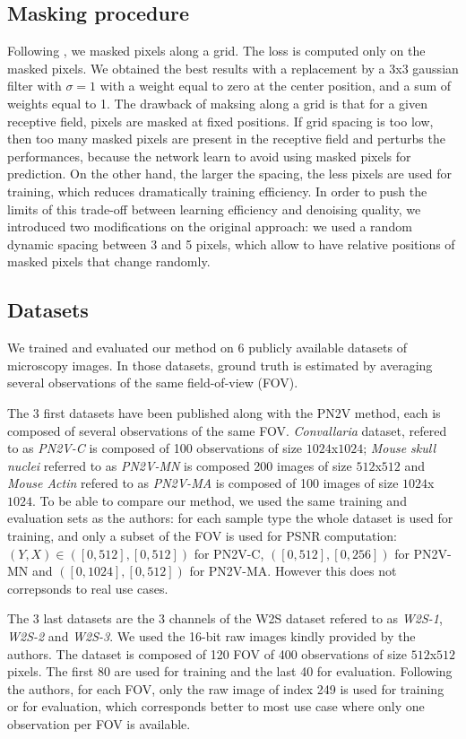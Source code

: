 \documentclass{article}
\begin{document}
\subsection{Masking procedure}
Following \cite{batson2019noise2self}, we masked pixels along a grid. The loss is computed only on the masked pixels.
We obtained the best results with a replacement by a 3x3 gaussian filter with $\sigma=1$ with a weight equal to zero at the center position, and a sum of weights equal to 1.
The drawback of maksing along a grid is that for a given receptive field, pixels are masked at fixed positions. If grid spacing is too low, then too many masked pixels are present in the receptive field and perturbs the performances, because the network learn to avoid using masked pixels for prediction. On the other hand, the larger the spacing, the less pixels are used for training, which reduces dramatically training efficiency.
In order to push the limits of this trade-off between learning efficiency and denoising quality, we introduced two modifications on the original approach: we used a random dynamic spacing between 3 and 5 pixels, which allow to have relative positions of masked pixels that change randomly.

\subsection{Datasets}
We trained and evaluated our method on 6 publicly available datasets of microscopy images. In those datasets, ground truth is estimated by averaging several observations of the same field-of-view (FOV).

The 3 first datasets have been published along with the PN2V method\cite{krull2019probabilistic}, each is composed of several observations of the same FOV. \emph{Convallaria} dataset, refered to as \emph{PN2V-C} is composed of 100 observations of size $1024$x$1024$; \emph{Mouse skull nuclei} referred to as \emph{PN2V-MN} is composed 200 images of size $512$x$512$ and \emph{Mouse Actin} refered to as \emph{PN2V-MA} is composed of 100 images of size $1024$x$1024$.
To be able to compare our method, we used the same training and evaluation sets as the authors: for each sample type the whole dataset is used for training, and only a subset of the FOV is used for PSNR computation: $(Y,X)\in([0, 512], [0, 512])$ for PN2V-C, $([0, 512], [0, 256])$ for PN2V-MN and $([0, 1024], [0, 512])$ for PN2V-MA.
However this does not correpsonds to real use cases.

The 3 last datasets are the 3 channels of the W2S dataset\cite{zhou2020w2s} refered to as \emph{W2S-1}, \emph{W2S-2} and \emph{W2S-3}.
We used the 16-bit raw images kindly provided by the authors.
The dataset is composed of 120 FOV of 400 observations of size $512$x$512$ pixels.
The first 80 are used for training and the last 40 for evaluation.
Following the authors, for each FOV, only the raw image of index 249 is used for training or for evaluation, which corresponds better to most use case where only one observation per FOV is available.
\end{document}
